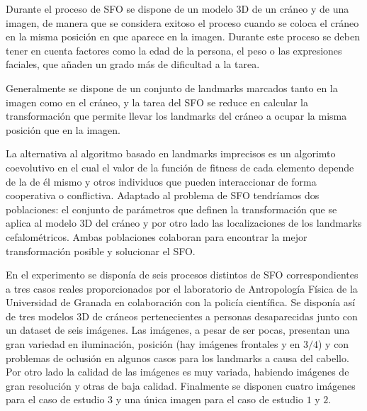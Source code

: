                 \medskip

                \noindent Durante el proceso de SFO se dispone de un modelo $3$D de un cráneo y de una imagen, de manera que se considera exitoso el proceso cuando se coloca el cráneo en la misma posición en que aparece en la imagen. Durante este proceso se deben tener en cuenta factores como la edad de la persona, el peso o las expresiones faciales, que añaden un grado más de dificultad a la tarea.

                \medskip

                \noindent Generalmente se dispone de un conjunto de landmarks marcados tanto en la imagen como en el cráneo, y la tarea del SFO se reduce en calcular la transformación que permite llevar los landmarks del cráneo a ocupar la misma posición que en la imagen.

                \medskip

                \noindent La alternativa al algoritmo basado en landmarks imprecisos es un algorimto coevolutivo en el cual el valor de la función de fitness de cada elemento depende de la de él mismo y otros individuos que pueden interaccionar de forma cooperativa o conflictiva. Adaptado al problema de SFO tendríamos dos poblaciones: el conjunto de parámetros que definen la transformación que se aplica al modelo $3$D del cráneo y por otro lado las localizaciones de los landmarks cefalométricos. Ambas poblaciones colaboran para encontrar la mejor transformación posible y solucionar el SFO.

                \medskip

                \noindent En el experimento se disponía de seis procesos distintos de SFO correspondientes a tres casos reales proporcionados por el laboratorio de Antropología Física de la Universidad de Granada en colaboración con la policía científica. Se disponía así de tres modelos $3$D de cráneos pertenecientes a personas desaparecidas junto con un dataset de seis imágenes. Las imágenes, a pesar de ser pocas, presentan una gran variedad en iluminación, posición (hay imágenes frontales y en $3/4$) y con problemas de oclusión en algunos casos para los landmarks a causa del cabello. Por otro lado la calidad de las imágenes es muy variada, habiendo imágenes de gran resolución y otras de baja calidad. Finalmente se disponen cuatro imágenes para el caso de estudio $3$ y una única imagen para el caso de estudio $1$ y $2$.

                \medskip
                


